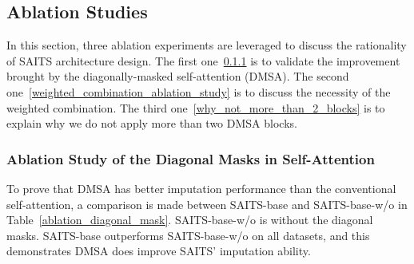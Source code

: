 \documentclass{article}
\begin{document}
\subsection{Ablation Studies} \label{ablation experiments}
In this section, three ablation experiments are leveraged to discuss the rationality of SAITS architecture design. The first one~\ref{diagonal_mask_ablation_study} is to validate the improvement brought by the diagonally-masked self-attention (DMSA). The second one~\ref{weighted_combination_ablation_study} is to discuss the necessity of the weighted combination. The third one~\ref{why_not_more_than_2_blocks} is to explain why we do not apply more than two DMSA blocks. 

\subsubsection{Ablation Study of the Diagonal Masks in Self-Attention} \label{diagonal_mask_ablation_study}
\begin{table} [!htb]
	\caption{Ablation experiment results of the diagonal masks in self-attention. SAITS-base-w/o is the exact same as SAITS-base, except it is without the diagonal masks in self-attention layers.}
	\label{ablation_diagonal_mask}
	\centering
	\begin{minipage}{1\textwidth}
\end{minipage}
\end{table}
To prove that DMSA has better imputation performance than the conventional self-attention, a comparison is made between SAITS-base and SAITS-base-w/o in Table~\ref{ablation_diagonal_mask}. SAITS-base-w/o is without the diagonal masks. SAITS-base outperforms SAITS-base-w/o on all datasets, and this demonstrates DMSA does improve SAITS' imputation ability.
\end{document}
